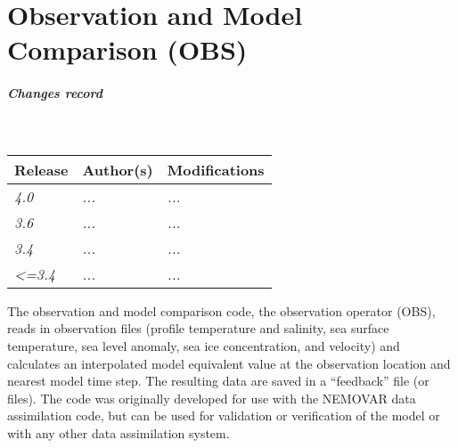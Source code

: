 \documentclass[../main/NEMO_manual]{subfiles}
\begin{document}
\chapter{Observation and Model Comparison (OBS)}
\label{chap:OBS}


\thispagestyle{plain}

\chaptertoc

\paragraph{Changes record} ~\\

{\footnotesize
  \begin{tabularx}{\textwidth}{l||X|X}
    Release & Author(s) & Modifications \\
    \hline
    {\em   4.0} & {\em ...} & {\em ...} \\
    {\em   3.6} & {\em ...} & {\em ...} \\
    {\em   3.4} & {\em ...} & {\em ...} \\
    {\em <=3.4} & {\em ...} & {\em ...}
  \end{tabularx}
}

\clearpage

The observation and model comparison code, the observation operator (OBS), reads in observation files
(profile temperature and salinity, sea surface temperature, sea level anomaly, sea ice concentration, and velocity) and calculates an interpolated model equivalent value at the observation location and nearest model time step.
The resulting data are saved in a ``feedback'' file (or files).
The code was originally developed for use with the NEMOVAR data assimilation code,
but can be used for validation or verification of the model or with any other data assimilation system.
\end{document}
